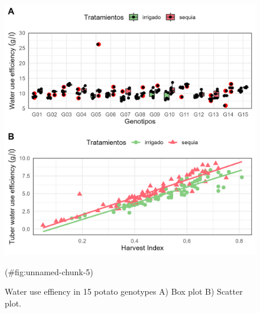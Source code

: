 \begin{Shaded}
\begin{Highlighting}[]
\OtherTok{\textless{}{-}} 
\NormalTok{                  , } 
\NormalTok{                  , } \NormalTok{)}

\NormalTok{(}
\NormalTok{        , }
\NormalTok{        , } 
\NormalTok{        , } 
\NormalTok{        , } 
\NormalTok{        , } 
\NormalTok{        , } 
\NormalTok{        )}

\SpecialCharTok{::}\NormalTok{(}\NormalTok{)}
\end{Highlighting}
\end{Shaded}

\begin{figure}

{\centering \includegraphics[width=0.98\linewidth]{files/fig-01} 

}

\caption{Water use effiency in 15 potato genotypes A) Box plot B) Scatter plot.}(\#fig:unnamed-chunk-5)
\end{figure}

